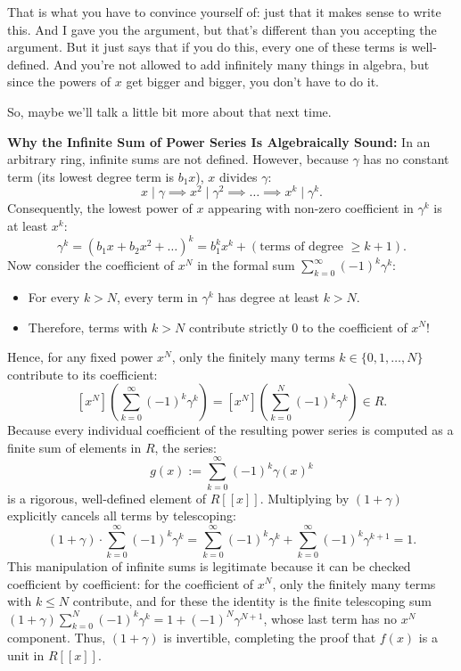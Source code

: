 \begin{proofWrapper}
\begin{speech}[00:41:31 - 00:42:50]
That is what you have to convince yourself of: just that it makes sense to write this. And I gave you the argument, but that's different than you accepting the argument. But it just says that if you do this, every one of these terms is well-defined. And you're not allowed to add infinitely many things in algebra, but since the powers of $x$ get bigger and bigger, you don't have to do it.

So, maybe we'll talk a little bit more about that next time. 
\end{speech}

\begin{content}
\textbf{Why the Infinite Sum of Power Series Is Algebraically Sound:}
In an arbitrary ring, infinite sums are not defined. However, because $\gamma$ has no constant term (its lowest degree term is $b_1 x$), $x$ divides $\gamma$:
\begin{equation}\label{eq:x-divisibility-chain}
x \mid \gamma \implies x^2 \mid \gamma^2 \implies \dots \implies x^k \mid \gamma^k.
\end{equation}
Consequently, the lowest power of $x$ appearing with non-zero coefficient in $\gamma^k$ is at least $x^k$:
\[
\gamma^k = (b_1 x + b_2 x^2 + \dots)^k = b_1^k x^k + (\text{terms of degree } \ge k+1).
\]
Now consider the coefficient of $x^N$ in the formal sum $\sum_{k=0}^\infty (-1)^k \gamma^k$:
\begin{itemize}
    \item For every $k > N$, every term in $\gamma^k$ has degree at least $k > N$.
    \item Therefore, terms with $k > N$ contribute strictly $0$ to the coefficient of $x^N$!
\end{itemize}
Hence, for any fixed power $x^N$, only the finitely many terms $k \in \{0, 1, \dots, N\}$ contribute to its coefficient:
\begin{equation}\label{eq:finite-coeff-contribution}
[x^N]\left( \sum_{k=0}^\infty (-1)^k \gamma^k \right) = [x^N]\left( \sum_{k=0}^N (-1)^k \gamma^k \right) \in R.
\end{equation}
Because every individual coefficient of the resulting power series is computed as a finite sum of elements in $R$, the series:
\[
g(x) := \sum_{k=0}^\infty (-1)^k \gamma(x)^k
\]
is a rigorous, well-defined element of $R[[x]]$. Multiplying by $(1 + \gamma)$ explicitly cancels all terms by telescoping:
\[
(1 + \gamma) \cdot \sum_{k=0}^\infty (-1)^k \gamma^k = \sum_{k=0}^\infty (-1)^k \gamma^k + \sum_{k=0}^\infty (-1)^k \gamma^{k+1} = 1.
\]
This manipulation of infinite sums is legitimate because it can be checked coefficient by coefficient: for the coefficient of $x^N$, only the finitely many terms with $k \le N$ contribute, and for these the identity is the finite telescoping sum $(1 + \gamma) \sum_{k=0}^{N} (-1)^k \gamma^k = 1 + (-1)^N \gamma^{N+1}$, whose last term has no $x^N$ component.
Thus, $(1 + \gamma)$ is invertible, completing the proof that $f(x)$ is a unit in $R[[x]]$.
\end{content}


\end{proofWrapper}
